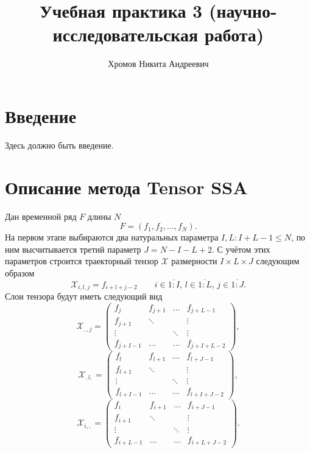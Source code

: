 \documentclass[specialist,
    substylefile = spbu_report.rtx,
    subf,href,colorlinks=true, 12pt]{disser}
\theoremstyle{plain}
\theoremstyle{definition}
\theoremstyle{remark}
\begin{document}
    \title{Учебная практика 3 (научно-исследовательская работа)}
    \author{Хромов Никита Андреевич}
    \date{\number\year}
    \maketitle

    \tableofcontents


    \section{Введение}\label{sec:intro}
    Здесь должно быть введение.
    \newpage


    \section{Описание метода Tensor SSA}\label{sec:Tensor SSA-method-description}
    Дан временной ряд $F$ длины $N$
    \[F=(f_1,f_2,\ldots,f_N).\]
    На первом этапе выбираются два натуральных параметра $I, L: I+L-1\leqslant N$, по ним высчитывается третий параметр $J=N-I-L+2$.
    С учётом этих параметров строится траекторный тензор $\mathcal X$ размерности $I\times L \times J$ следующим образом
    \[\mathcal{X}_{i,l,j}=f_{i+l+j-2}\qquad i\in \overline{1:I},\, l \in\overline{1:L},\, j \in\overline{1:J}.\]
    Слои тензора будут иметь следующий вид
    \[\mathcal{X}_{,,j}=
    \begin{pmatrix}
        f_j       & f_{j+1} & \ldots & f_{j+L-1}   \\
        f_{j+1}   & \ddots  &        & \vdots      \\
        \vdots    &         & \ddots & \vdots      \\
        f_{j+I-1} & \ldots  & \ldots & f_{j+I+L-2}
    \end{pmatrix},\]
    \[\mathcal{X}_{,l,}=
    \begin{pmatrix}
        f_l       & f_{l+1} & \ldots & f_{l+J-1}   \\
        f_{l+1}   & \ddots  &        & \vdots      \\
        \vdots    &         & \ddots & \vdots      \\
        f_{l+I-1} & \ldots  & \ldots & f_{l+I+J-2}
    \end{pmatrix},\]
    \[\mathcal{X}_{i,,}=
    \begin{pmatrix}
        f_i       & f_{i+1} & \ldots & f_{i+J-1}   \\
        f_{i+1}   & \ddots  &        & \vdots      \\
        \vdots    &         & \ddots & \vdots      \\
        f_{i+L-1} & \ldots  & \ldots & f_{i+L+J-2}
    \end{pmatrix}.\]
\end{document}
